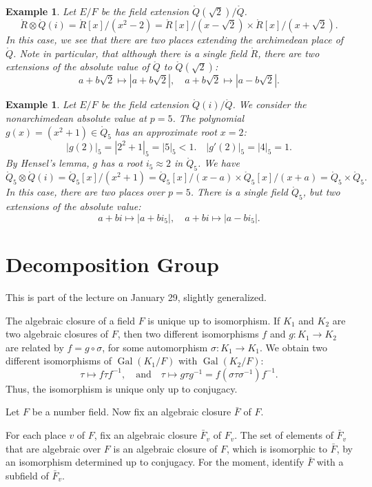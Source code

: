 \documentclass{amsart}
\newtheorem{example}[exercise]{Example}
\def\abs#1{{|#1|}}
\def\op#1{{\operatorname{#1}}}
\def\RR{\ring{R}}
\def\oG{\op{Gal}}
\begin{document}
\begin{example} Let $E/F$ be the field extension $\ring{Q}(\sqrt{2})/\ring{Q}$.
\[
\RR\otimes \ring{Q}(i) = \RR[x]/(x^2 - 2) = 
\RR[x]/(x - \sqrt{2}) \times
\RR[x]/(x + \sqrt{2}).
\]
In this case, we see that there are two places extending the archimedean
place of $\ring{Q}$.  Note in particular, that although there is a single field
$\RR$, there are two extensions of the absolute value of $\ring{Q}$ to
$\ring{Q}(\sqrt{2})$:
\[
a+ b\sqrt{2}\mapsto \abs{a + b \sqrt{2}},\quad a + b\sqrt{2}\mapsto \abs{a-b\sqrt{2}}.
\]
\end{example}

\begin{example} Let $E/F$ be the field extension $\ring{Q}(i)/\ring{Q}$.
We consider the nonarchimedean absolute value at $p=5$.
The polynomial $g(x)=(x^2+1)\in\ring{Q}_5$ has an approximate root $x=2$:
\[
\abs{g(2)}_5=\abs{2^2 + 1}_5=\abs{5}_5 < 1.\quad \abs{g'(2)}_5 = \abs{4}_5=1.
\]
By Hensel's lemma, $g$ has a root $i_5\approx 2$ in $\ring{Q}_5$. We have
\[
\ring{Q}_5\otimes \ring{Q}(i) = \ring{Q}_5[x]/(x^2+1) = 
\ring{Q}_5[x]/(x - a)\times
\ring{Q}_5[x]/(x+a) = \ring{Q}_5\times\ring{Q}_5.
\]
In this case, there are two places over $p=5$.  There is a single field
$\ring{Q}_5$, but two extensions of the absolute value:
\[
a + b i \mapsto \abs{a + b i_5},\quad
a + b i \mapsto \abs{a - b i_5}.
\]
\end{example}



\newpage
\section{Decomposition Group}

This is part of the lecture on January 29, slightly generalized.

The algebraic closure of a field $F$ is unique up to isomorphism.
If $K_1$ and $K_2$ are two algebraic closures of $F$, then two different
isomorphisms $f$ and $g:K_1\to K_2$ are related by $f = g \circ \sigma$, for some 
automorphism $\sigma: K_1\to K_1$.  We obtain two different isomorphisms
of $\oG(K_1/F)$ with $\oG(K_2/F)$:
\[
\tau \mapsto f \tau f^{-1},\quad \text{and}\quad 
\tau\mapsto g\tau g^{-1} = f (\sigma\tau\sigma^{-1}) f^{-1}.
\]
Thus, the isomorphism is unique only up to conjugacy.  

Let $F$ be a number field.
Now fix an algebraic closure $\bar{F}$ of $F$.

For each place  $v$ of $F$, fix an algebraic closure $\bar{F}_v$ of
$F_v$.  The set of elements of $\bar{F}_v$ that are
algebraic over $F$ is an algebraic closure of $F$, which
is isomorphic to $\bar{F}$, by an isomorphism determined up to
conjugacy.  For the moment, identify $\bar{F}$ with a subfield
of $\bar{F}_v$.
\end{document}

